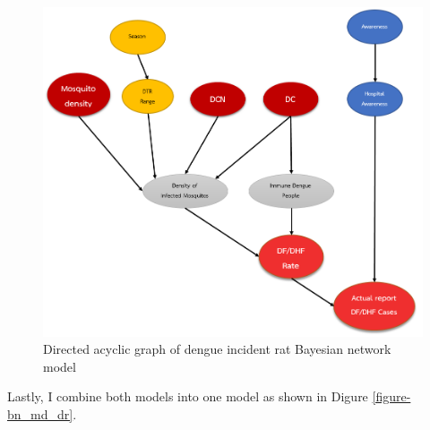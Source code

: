 \documentclass[review]{elsarticle}
\begin{document}
\begin{figure}[htbp]
	\begin{center}
		\includegraphics[width=150mm]{./figures/bn_df_rate}
		\caption{Directed acyclic graph of dengue incident rat Bayesian network model}
		\label{figure-bn-df-rate}
	\end{center}
\end{figure}



%	

Lastly, I combine both models into one model as shown in Digure \ref{figure-bn_md_dr}. 
\end{document}
